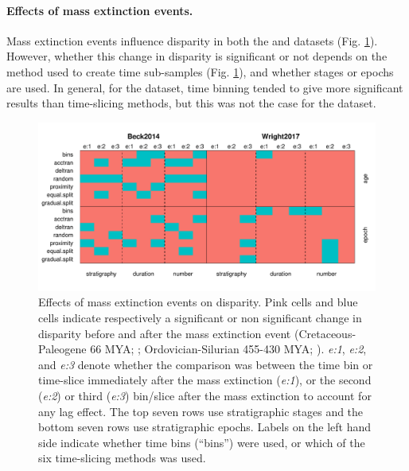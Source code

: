 \documentclass[12pt,a4paper]{article}
\begin{document}
\paragraph{Effects of mass extinction events.}
Mass extinction events influence disparity in both the \cite{beckancient2014} and \cite{wright2017bayesian} datasets (Fig. \ref{figure:extinction1}).
However, whether this change in disparity is significant or not depends on the method used to create time sub-samples (Fig. \ref{figure:extinction1}), and whether stages or epochs are used. 
In general, for the \cite{beckancient2014} dataset, time binning tended to give more significant results than time-slicing methods, but this was not the case for the \cite{wright2017bayesian} dataset.

\begin{figure}[!htbp]
    \centering
    \includegraphics[width=1\linewidth, height=1\textheight, keepaspectratio]{figures/Figure4-fig-extinction-effect.pdf}
    \caption[Extinction example datasets.]
    {Effects of mass extinction events on disparity.
    Pink cells and blue cells indicate respectively a significant or non significant change in disparity before and after the mass extinction event (Cretaceous-Paleogene 66 MYA; \citealt{beckancient2014}; Ordovician-Silurian 455-430 MYA; \citealt{wright2017bayesian}).
    \textit{e:1}, \textit{e:2}, and \textit{e:3} denote whether the comparison was between the time bin or time-slice immediately after the mass extinction (\textit{e:1}), or the second (\textit{e:2}) or third (\textit{e:3}) bin/slice after the mass extinction to account for any lag effect.
    The top seven rows use stratigraphic stages and the bottom seven rows use stratigraphic epochs.
    Labels on the left hand side indicate whether time bins (``bins'') were used, or which of the six time-slicing methods was used.}
    \label{figure:extinction1}
\end{figure}
\end{document}
